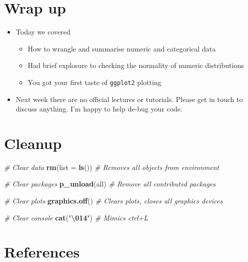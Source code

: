 \documentclass[
]{article}
\newenvironment{Shaded}{\begin{snugshade}}{\end{snugshade}}
\newcommand{\AttributeTok}[1]{\textcolor[rgb]{0.13,0.29,0.53}{#1}}
\newcommand{\CommentTok}[1]{\textcolor[rgb]{0.56,0.35,0.01}{\textit{#1}}}
\newcommand{\FunctionTok}[1]{\textcolor[rgb]{0.13,0.29,0.53}{\textbf{#1}}}
\newcommand{\NormalTok}[1]{#1}
\newcommand{\SpecialCharTok}[1]{\textcolor[rgb]{0.81,0.36,0.00}{\textbf{#1}}}
\newcommand{\StringTok}[1]{\textcolor[rgb]{0.31,0.60,0.02}{#1}}
\providecommand{\tightlist}{%
  \setlength{\itemsep}{0pt}\setlength{\parskip}{0pt}}
\begin{document}
\hypertarget{wrap-up}{%
\section{Wrap up}\label{wrap-up}}

\begin{itemize}
\tightlist
\item
  Today we covered

  \begin{itemize}
  \tightlist
  \item
    How to wrangle and summarise numeric and categorical data
  \item
    Had brief explosure to checking the normality of numeric
    distributions
  \item
    You got your first taste of \texttt{ggplot2} plotting
  \end{itemize}
\item
  Next week there are no official lectures or tutorials. Please get in
  touch to discuss anything. I'm happy to help de-bug your code.
\end{itemize}

\hypertarget{cleanup}{%
\section{Cleanup}\label{cleanup}}

\begin{Shaded}
\begin{Highlighting}[]
\CommentTok{\# Clear data}
\FunctionTok{rm}\NormalTok{(}\AttributeTok{list =} \FunctionTok{ls}\NormalTok{())  }\CommentTok{\# Removes all objects from environment}

\CommentTok{\# Clear packages}
\FunctionTok{p\_unload}\NormalTok{(all)  }\CommentTok{\# Remove all contributed packages}

\CommentTok{\# Clear plots}
\FunctionTok{graphics.off}\NormalTok{()  }\CommentTok{\# Clears plots, closes all graphics devices}

\CommentTok{\# Clear console}
\FunctionTok{cat}\NormalTok{(}\StringTok{"}\SpecialCharTok{\textbackslash{}014}\StringTok{"}\NormalTok{)  }\CommentTok{\# Mimics ctrl+L}
\end{Highlighting}
\end{Shaded}

\hypertarget{references}{%
\section{References}\label{references}}
\end{document}

